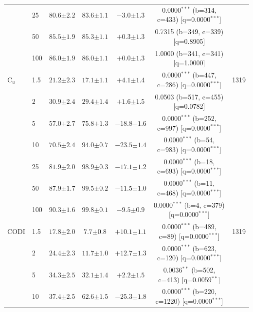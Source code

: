 \begin{table}[h!]
\begin{tabular}{l l cccc c}
 & 25 & $80.6 {\scriptstyle \pm 2.2}$ & $83.6 {\scriptstyle \pm 1.1}$ & $-3.0 {\scriptstyle \pm 1.3}$ & 0.0000$^{***}$ (b=314, c=433) [q=0.0000$^{***}$] &  \\
 & 50 & $85.5 {\scriptstyle \pm 1.9}$ & $85.3 {\scriptstyle \pm 1.1}$ & $+0.3 {\scriptstyle \pm 1.3}$ & 0.7315 (b=349, c=339) [q=0.8905] &  \\
 & 100 & $86.0 {\scriptstyle \pm 1.9}$ & $86.0 {\scriptstyle \pm 1.1}$ & $+0.0 {\scriptstyle \pm 1.3}$ & 1.0000 (b=341, c=341) [q=1.0000] &  \\
\midrule
C$_u$ & 1.5 & $21.2 {\scriptstyle \pm 2.3}$ & $17.1 {\scriptstyle \pm 1.1}$ & $+4.1 {\scriptstyle \pm 1.4}$ & 0.0000$^{***}$ (b=447, c=286) [q=0.0000$^{***}$] & 1319 \\
 & 2 & $30.9 {\scriptstyle \pm 2.4}$ & $29.4 {\scriptstyle \pm 1.4}$ & $+1.6 {\scriptstyle \pm 1.5}$ & 0.0503 (b=517, c=455) [q=0.0782] &  \\
 & 5 & $57.0 {\scriptstyle \pm 2.7}$ & $75.8 {\scriptstyle \pm 1.3}$ & $-18.8 {\scriptstyle \pm 1.6}$ & 0.0000$^{***}$ (b=252, c=997) [q=0.0000$^{***}$] &  \\
 & 10 & $70.5 {\scriptstyle \pm 2.4}$ & $94.0 {\scriptstyle \pm 0.7}$ & $-23.5 {\scriptstyle \pm 1.4}$ & 0.0000$^{***}$ (b=54, c=983) [q=0.0000$^{***}$] &  \\
 & 25 & $81.9 {\scriptstyle \pm 2.0}$ & $98.9 {\scriptstyle \pm 0.3}$ & $-17.1 {\scriptstyle \pm 1.2}$ & 0.0000$^{***}$ (b=18, c=693) [q=0.0000$^{***}$] &  \\
 & 50 & $87.9 {\scriptstyle \pm 1.7}$ & $99.5 {\scriptstyle \pm 0.2}$ & $-11.5 {\scriptstyle \pm 1.0}$ & 0.0000$^{***}$ (b=11, c=468) [q=0.0000$^{***}$] &  \\
 & 100 & $90.3 {\scriptstyle \pm 1.6}$ & $99.8 {\scriptstyle \pm 0.1}$ & $-9.5 {\scriptstyle \pm 0.9}$ & 0.0000$^{***}$ (b=4, c=379) [q=0.0000$^{***}$] &  \\
\midrule
CODI & 1.5 & $17.8 {\scriptstyle \pm 2.0}$ & $7.7 {\scriptstyle \pm 0.8}$ & $+10.1 {\scriptstyle \pm 1.1}$ & 0.0000$^{***}$ (b=489, c=89) [q=0.0000$^{***}$] & 1319 \\
 & 2 & $24.4 {\scriptstyle \pm 2.3}$ & $11.7 {\scriptstyle \pm 1.0}$ & $+12.7 {\scriptstyle \pm 1.3}$ & 0.0000$^{***}$ (b=623, c=120) [q=0.0000$^{***}$] &  \\
 & 5 & $34.3 {\scriptstyle \pm 2.5}$ & $32.1 {\scriptstyle \pm 1.4}$ & $+2.2 {\scriptstyle \pm 1.5}$ & 0.0036$^{**}$ (b=502, c=413) [q=0.0059$^{**}$] &  \\
 & 10 & $37.4 {\scriptstyle \pm 2.5}$ & $62.6 {\scriptstyle \pm 1.5}$ & $-25.3 {\scriptstyle \pm 1.8}$ & 0.0000$^{***}$ (b=220, c=1220) [q=0.0000$^{***}$] &  \\

\end{tabular}
\end{table}
